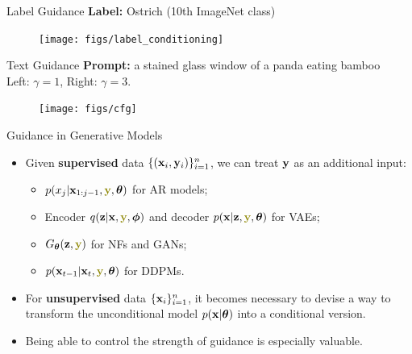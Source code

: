 \documentclass{beamer}
\begin{document}
\begin{frame}{Label Guidance}
	\textbf{Label:} Ostrich (10th ImageNet class) 
	\begin{figure}
		\texttt{[image: figs/label\_conditioning]}
	\end{figure}
\end{frame}
\begin{frame}{Text Guidance}
	\textbf{Prompt:} a stained glass window of a panda eating bamboo \\
	Left: $\gamma = 1$, Right: $\gamma = 3$.
	\begin{figure}
		\texttt{[image: figs/cfg]}
	\end{figure}
\end{frame}
\begin{frame}{Guidance in Generative Models}
	\begin{itemize}
	\item Given \textbf{supervised} data $\{(\mathbf{x}_i, \mathbf{y}_i)\}_{i=1}^n$, we can treat $\mathbf{y}$ as an additional input:
	\begin{itemize}
		\item $p(x_j | \bx_{1:j-1}, {\color{olive}\by}, \btheta)$ for AR models;
		\item Encoder $q(\bz | \bx, {\color{olive}\by}, \bphi)$ and decoder $p(\bx | \bz, {\color{olive}\by}, \btheta)$ for VAEs;
		\item $G_{\btheta}(\bz, {\color{olive}\by})$ for NFs and GANs;
		\item $p(\bx_{t-1} | \bx_t, {\color{olive}\by}, \btheta)$ for DDPMs.
	\end{itemize}
	\item For \textbf{unsupervised} data $\{\mathbf{x}_i\}_{i=1}^n$, it becomes necessary to devise a way to transform the unconditional model $p(\mathbf{x} | \boldsymbol{\theta})$ into a conditional version.
	\item Being able to control the strength of guidance is especially valuable.
	\end{itemize}
\end{frame}
\end{document}
